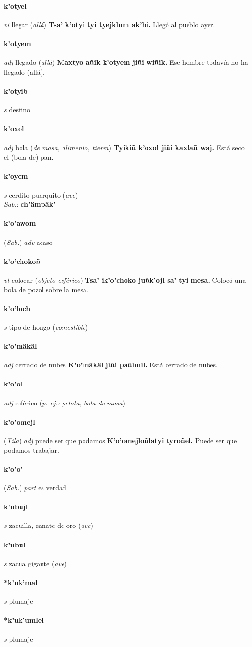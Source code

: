 \documentclass{scrbook}
\newcommand{\entry}[1]{\paragraph{#1}}
\newcommand{\partofspeech}[1]{\textit{#1}}
\newcommand{\spanishtranslation}[1]{#1}
\newcommand{\clarification}[1]{(\textit{#1})}
\newcommand{\cholexample}[1]{\textbf{#1}}
\newcommand{\exampletranslation}[1]{#1}
\newcommand{\dialectvariant}[1]{\\\textit{#1}:}
\newcommand{\dialectword}[1]{\textbf{#1}}
\newcommand{\relevantdialect}[1]{(\textit{#1})}
\begin{document}
\begin{multicols}{2}
\entry{k'otyel}
\partofspeech{vi}
\spanishtranslation{llegar}
\clarification{allá}
\cholexample{Tsa' k'otyi tyi tyejklum ak'bi.}
\exampletranslation{Llegó al pueblo ayer.}

\entry{k'otyem}
\partofspeech{adj}
\spanishtranslation{llegado}
\clarification{allá}
\cholexample{Maxtyo añik k'otyem jiñi wiñik.}
\exampletranslation{Ese hombre todavía no ha llegado (allá).}

\entry{k'otyib}
\partofspeech{s}
\spanishtranslation{destino}

\entry{k'oxol}
\partofspeech{adj}
\spanishtranslation{bola}
\clarification{de masa, alimento, tierra}
\cholexample{Tyikiñ k'oxol jiñi kaxlañ waj.}
\exampletranslation{Está seco el (bola de) pan.}

\entry{k'oyem}
\partofspeech{s}
\spanishtranslation{cerdito}
\spanishtranslation{puerquito}
\clarification{ave}
\dialectvariant{Sab.}
\dialectword{ch'ämpäk'}

\entry{k'o'awom}
\relevantdialect{Sab.}
\partofspeech{adv}
\spanishtranslation{acaso}

\entry{k'o'chokoñ}
\partofspeech{vt}
\spanishtranslation{colocar}
\clarification{objeto esférico}
\cholexample{Tsa' ik'o'choko juñk'ojl sa' tyi mesa.}
\exampletranslation{Colocó una bola de pozol sobre la mesa.}

\entry{k'o'loch}
\partofspeech{s}
\spanishtranslation{tipo de hongo}
\clarification{comestible}

\entry{k'o'mäkäl}
\partofspeech{adj}
\spanishtranslation{cerrado de nubes}
\cholexample{K'o'mäkäl jiñi pañimil.}
\exampletranslation{Está cerrado de nubes.}

\entry{k'o'ol}
\partofspeech{adj}
\spanishtranslation{esférico}
\clarification{p. ej.: pelota, bola de masa}

\entry{k'o'omejl}
\relevantdialect{Tila}
\partofspeech{adj}
\spanishtranslation{puede ser que podamos}
\cholexample{K'o'omejloñlatyi tyroñel.}
\exampletranslation{Puede ser que podamos trabajar.}

\entry{k'o'o'}
\relevantdialect{Sab.}
\partofspeech{part}
\spanishtranslation{es verdad}

\entry{k'ubujl}
\partofspeech{s}
\spanishtranslation{zacuilla, zanate de oro}
\clarification{ave}

\entry{k'ubul}
\partofspeech{s}
\spanishtranslation{zacua gigante}
\clarification{ave}

\entry{*k'uk'mal}
\partofspeech{s}
\spanishtranslation{plumaje}

\entry{*k'uk'umlel}
\partofspeech{s}
\spanishtranslation{plumaje}


\end{multicols}
\end{document}
